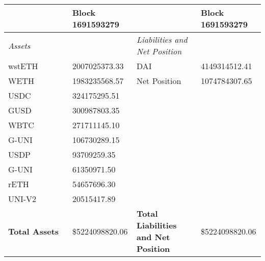 
\begin{table}
\centering
\caption{Balance Sheet of MakerDAO}
\label{tab:bal}

\begin{longtable}{@{}p{0.25\linewidth}p{0.25\linewidth}p{0.25\linewidth}p{0.25\linewidth}@{}}

\toprule


& Block 1691593279 & & Block 1691593279 \\

\midrule
\textit{Assets} & & \textit{Liabilities and Net Position} \\
wstETH & 2007025373.33 & DAI &4149314512.41 \\
WETH & 1983235568.57 & Net Position &1074784307.65 \\
USDC & 324175295.51 & & \\
GUSD & 300987803.35 & & \\
WBTC & 271711145.10 & & \\
G-UNI & 106730289.15 & & \\
USDP & 93709259.35 & & \\
G-UNI & 61350971.50 & & \\
rETH & 54657696.30 & & \\
UNI-V2 & 20515417.89 & & \\

\midrule

\textbf{Total Assets} & \$5224098820.06 & \textbf{Total Liabilities and Net Position} & \$5224098820.06 \\

\bottomrule

\end{longtable}

\end{table}
